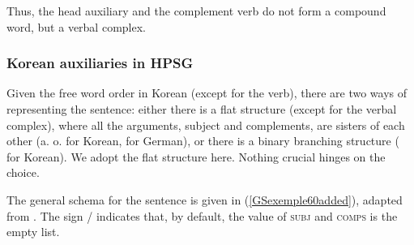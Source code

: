 \documentclass[output=paper
	        ,collection
	        ,collectionchapter
 	        ,biblatex
                ,babelshorthands
                ,newtxmath
                ,draftmode
                ,colorlinks, citecolor=brown
]{langscibook}
\begin{document}
{\eal
	\label{GSexemple57added-ab}
	\label{GSexemple57added-a}
	
	\label{GSexemple57added-b}
\zl

Thus, the head auxiliary and the complement verb do not form a compound word, but a verbal
complex.

\subsubsection{Korean auxiliaries in HPSG}\label{GSsection4.2.3}

Given the free word order in Korean (except for the verb), there are two ways of representing the sentence: either there is a flat structure (except for the verbal complex), where all the arguments, subject and complements, are sisters of each other (a. o. \citealt{Chung98a-u} for Korean, \citealt{HN98a} for German), or there is a binary branching structure (\citealt{Kim2016a-u} for Korean). We adopt the flat structure here. Nothing crucial hinges on the choice.

The general schema for the sentence is given in (\ref{GSexemple60added}), adapted from \cite[178]{Chung98a-u}. The sign / indicates that, by default, the value of \textsc{subj} and \textsc{comps} is the empty list.


\begin{exe}
    \label{GSexemple60added}
\end{exe}

}
\end{document}
